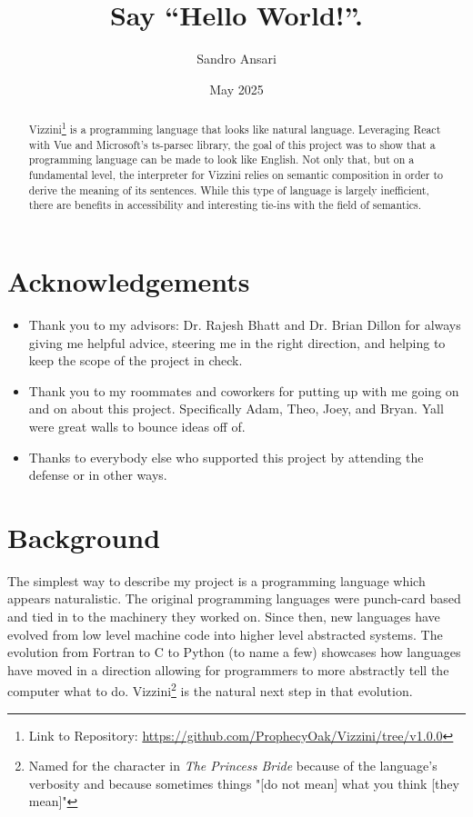 \documentclass[titlepage]{article}
\title{Say ``Hello World!''.}
\author{Sandro Ansari}
\date{May 2025}
\newcommand{\langName}{Vizzini}
\begin{document}
\maketitle

\begin{abstract}
	\langName{}\footnote{Link to Repository: \url{https://github.com/ProphecyOak/Vizzini/tree/v1.0.0}} is a programming language that looks like natural language. Leveraging React with Vue and Microsoft's ts-parsec library, the goal of this project was to show that a programming language can be made to look like English. Not only that, but on a fundamental level, the interpreter for \langName{} relies on semantic composition in order to derive the meaning of its sentences. While this type of language is largely inefficient, there are benefits in accessibility and interesting tie-ins with the field of semantics.
\end{abstract}

\section*{Acknowledgements}
\begin{itemize}
	\item Thank you to my advisors: Dr. Rajesh Bhatt and Dr. Brian Dillon for always giving me helpful advice, steering me in the right direction, and helping to keep the scope of the project in check.
	\item Thank you to my roommates and coworkers for putting up with me going on and on about this project. Specifically Adam, Theo, Joey, and Bryan. Yall were great walls to bounce ideas off of.
	\item Thanks to everybody else who supported this project by attending the defense or in other ways.
\end{itemize}

\newpage{}
\section*{Background}
The simplest way to describe my project is a programming language which appears naturalistic. The original programming languages were punch-card based and tied in to the machinery they worked on. Since then, new languages have evolved from low level machine code into higher level abstracted systems. The evolution from Fortran to C to Python (to name a few) showcases how languages have moved in a direction allowing for programmers to more abstractly tell the computer what to do. \langName{}\footnote{Named for the character in \textit{The Princess Bride} because of the language's verbosity and because sometimes things "[do not mean] what you think [they mean]"\cite{Goldman_1987}} is the natural next step in that evolution.
\end{document}
